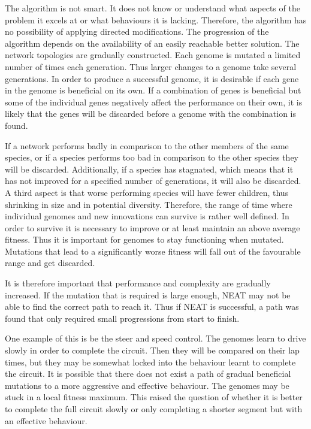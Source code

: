 The algorithm is not smart. It does not know or understand what aspects of the problem it excels at or what behaviours it is lacking. Therefore, the algorithm has no possibility of applying directed modifications. The progression of the algorithm depends on the availability of an easily reachable better solution. The network topologies are gradually constructed. Each genome is mutated a limited number of times each generation. Thus larger changes to a genome take several generations. In order to produce a successful genome, it is desirable if each gene in the genome is beneficial on its own. If a combination of genes is beneficial but some of the individual genes negatively affect the performance on their own, it is likely that the genes will be discarded before a genome with the combination is found.

If a network performs badly in comparison to the other members of the same species, or if a species performs too bad in comparison to the other species they will be discarded\cite{stanley:neat}. Additionally, if a species has stagnated, which means that it has not improved for a specified number of generations, it will also be discarded. A third aspect is that worse performing species will have fewer children, thus shrinking in size and in potential diversity. Therefore, the range of time where individual genomes and new innovations can survive is rather well defined. In order to survive it is necessary to improve or at least maintain an above average fitness. Thus it is important for genomes to stay functioning when mutated. Mutations that lead to a significantly worse fitness will fall out of the favourable range and get discarded. 

It is therefore important that performance and complexity are gradually increased. If the mutation that is required is large enough, NEAT may not be able to find the correct path to reach it. Thus if NEAT is successful, a path was found that only required small progressions from start to finish.

One example of this is be the steer and speed control. The genomes learn to drive slowly in order to complete the circuit. Then they will be compared on their lap times, but they may be somewhat locked into the behaviour learnt to complete the circuit. It is possible that there does not exist a path of gradual beneficial mutations to a more aggressive and effective behaviour. The genomes may be stuck in a local fitness maximum. This raised the question of whether it is better to complete the full circuit slowly or only completing a shorter segment but with an effective behaviour.

